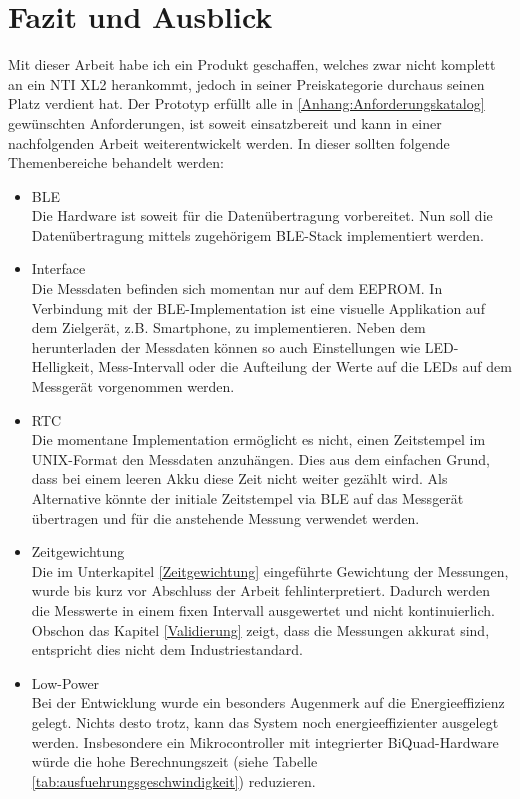 \documentclass[12pt]{article}
\begin{document}
	\newpage
	\section{Fazit und Ausblick}
	Mit dieser Arbeit habe ich ein Produkt geschaffen, welches zwar nicht komplett an ein NTI XL2 herankommt, jedoch in seiner Preiskategorie durchaus seinen Platz verdient hat. Der Prototyp erfüllt alle in \ref{Anhang:Anforderungskatalog} gewünschten Anforderungen, ist soweit einsatzbereit und kann in einer nachfolgenden Arbeit weiterentwickelt werden. In dieser sollten folgende Themenbereiche behandelt werden:
	\begin{itemize}
		\item BLE \\
		Die Hardware ist soweit für die Datenübertragung vorbereitet. Nun soll die Datenübertragung mittels zugehörigem BLE-Stack implementiert werden.
		\item Interface \\
		Die Messdaten befinden sich momentan nur auf dem EEPROM. In Verbindung mit der BLE-Implementation ist eine visuelle Applikation auf dem Zielgerät, z.B. Smartphone, zu implementieren. Neben dem herunterladen der Messdaten können so auch Einstellungen wie LED-Helligkeit, Mess-Intervall oder die Aufteilung der Werte auf die LEDs auf dem Messgerät vorgenommen werden.
		\item RTC \\
		Die momentane Implementation ermöglicht es nicht, einen Zeitstempel im UNIX-Format den Messdaten anzuhängen. Dies aus dem einfachen Grund, dass bei einem leeren Akku diese Zeit nicht weiter gezählt wird. Als Alternative könnte der initiale Zeitstempel via BLE auf das Messgerät übertragen und für die anstehende Messung verwendet werden.
		\item Zeitgewichtung \\
		Die im Unterkapitel \ref{Zeitgewichtung} eingeführte Gewichtung der Messungen, wurde bis kurz vor Abschluss der Arbeit fehlinterpretiert. Dadurch werden die Messwerte in einem fixen Intervall ausgewertet und nicht kontinuierlich. Obschon das Kapitel \ref{Validierung} zeigt, dass die Messungen akkurat sind, entspricht dies nicht dem Industriestandard.
		\item Low-Power \\
		Bei der Entwicklung wurde ein besonders Augenmerk auf die Energieeffizienz gelegt. Nichts desto trotz, kann das System noch energieeffizienter ausgelegt werden. Insbesondere ein Mikrocontroller mit integrierter BiQuad-Hardware würde die hohe Berechnungszeit (siehe Tabelle \ref{tab:ausfuehrungsgeschwindigkeit}) reduzieren.

\end{itemize}
\end{document}

